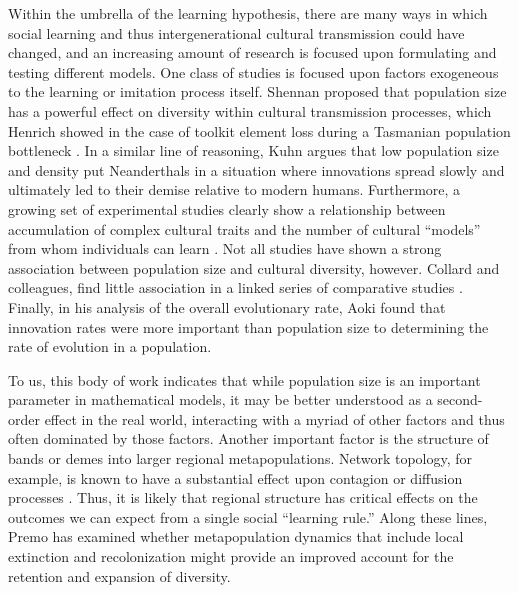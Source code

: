 Within the umbrella of the learning hypothesis, there are many ways in
which social learning and thus intergenerational cultural transmission
could have changed, and an increasing amount of research is focused upon
formulating and testing different models. One class of studies is
focused upon factors exogeneous to the learning or imitation process
itself. Shennan
\citetext{\citeyear{shennan2000population}; \citeyear{shennan2001demography}}
proposed that population size has a powerful effect on diversity within
cultural transmission processes, which Henrich showed in the case of
toolkit element loss during a Tasmanian population bottleneck
\citep{henrich2004}. In a similar line of reasoning, Kuhn
\citeyearpar{Kuhn2013Cultural-Transm} argues that low population size
and density put Neanderthals in a situation where innovations spread
slowly and ultimately led to their demise relative to modern humans.
Furthermore, a growing set of experimental studies clearly show a
relationship between accumulation of complex cultural traits and the
number of cultural ``models'' from whom individuals can learn
\citep{muthukrishna2014sociality, derex2013experimental, kempe2014experimental}.
Not all studies have shown a strong association between population size
and cultural diversity, however. Collard and colleagues, find little
association in a linked series of comparative studies
\citep{collard2011drives, collard2013population, collard2013risk, collard2013plos}.
Finally, in his analysis of the overall evolutionary rate, Aoki
\citeyearpar{Aoki2013Determinants-of} found that innovation rates were
more important than population size to determining the rate of evolution
in a population.

To us, this body of work indicates that while population size is an
important parameter in mathematical models, it may be better understood
as a second-order effect in the real world, interacting with a myriad of
other factors and thus often dominated by those factors. Another
important factor is the structure of bands or demes into larger regional
metapopulations. Network topology, for example, is known to have a
substantial effect upon contagion or diffusion processes
\citep[e.g.,][]{castellano2009statistical, smilkov2012influence}. Thus,
it is likely that regional structure has critical effects on the
outcomes we can expect from a single social ``learning rule.'' Along
these lines, Premo \citeyearpar{premo2012local} has examined whether
metapopulation dynamics that include local extinction and recolonization
might provide an improved account for the retention and expansion of
diversity.

